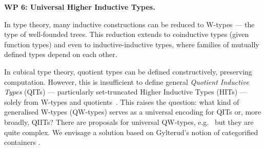 \documentclass[a4paper,11pt]{article}
\renewcommand{\paragraph}[1]{\textbf{#1.}}
\begin{document}



\paragraph{WP 6: Universal Higher Inductive Types}

In type theory, many inductive constructions can be reduced to W-types
— the type of well-founded trees. This reduction extends to
coinductive types (given function types) and even to
inductive-inductive types, where families of mutually defined types
depend on each other.

In cubical type theory, quotient types can be defined constructively,
preserving computation. However, this is insufficient to define
general \emph{Quotient Inductive Types} (QITs) — particularly
set-truncated Higher Inductive Types (HITs) — solely from W-types and
quotients~\cite{lumsdaine2020semantics}. This raises the question: what
kind of generalised W-types (QW-types) serves as a universal encoding
for QITs or, more broadly, QIITs? There are proposals for
universal QW-types,
e.g.~\cite{fiore2022quotients,kaposi2019constructing} but they are
quite complex. We envisage a solution based on Gylterud's notion of
categorified containers \cite{gylterud2011symmetric,altenkirch2024qits}. 
\end{document}
